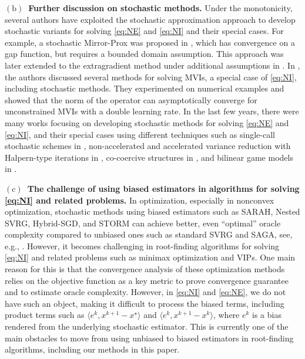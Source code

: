 \documentclass{article}
\newcommand{\iprods}[1]{\langle #1\rangle}
\theoremstyle{plain}
\theoremstyle{definition}
\theoremstyle{remark}
\begin{document}
\noindent\textbf{$\mathrm{(b)}$~Further discussion on stochastic methods.}
Under the monotonicity, several authors have exploited  the stochastic approximation approach \citep{RM1951} to develop stochastic variants for solving \eqref{eq:NE} and \eqref{eq:NI} and their special cases.
For example, a stochastic Mirror-Prox was proposed in \citep{juditsky2011solving}, which has convergence on a gap function, but requires a bounded domain assumption.
This approach was later extended to the extragradient method under additional assumptions in \citep{mishchenko2020revisiting}. 
In  \citep{hsieh2019convergence}, the authors discussed several methods for solving MVIs, a special case of \eqref{eq:NI}, including stochastic methods.
They experimented on numerical examples and showed that the norm of the operator can asymptotically converge for unconstrained MVIs  with a double learning rate.
In the last few years, there were many works focusing on developing stochastic methods for solving \eqref{eq:NE} and \eqref{eq:NI}, and their special cases using different techniques such as  single-call stochastic schemes in \citep{hsieh2019convergence}, non-accelerated and accelerated variance reduction with  Halpern-type iterations in \citep{cai2023variance,cai2022stochastic}, co-coercive structures in \citep{beznosikov2023stochastic}, and bilinear game models in \citep{li2022convergence}.

\noindent\textbf{$\mathrm{(c)}$~The challenge of using biased estimators in algorithms for solving \eqref{eq:NI} and related problems.}
In optimization, especially in nonconvex optimization, stochastic methods using biased estimators such as SARAH, Nested SVRG, Hybrid-SGD, and STORM can achieve better, even ``optimal'' oracle complexity compared to unbiased ones such as standard SVRG and SAGA, see, e.g., \citep{Cutkosky2019,driggs2019bias,Pham2019,Tran-Dinh2019a}.  
However, it becomes challenging in root-finding algorithms for solving \eqref{eq:NI} and related problems such as minimax optimization and VIPs.
One main reason for this is that the convergence analysis of these optimization methods relies on the objective function as a key metric to prove convergence guarantee and to estimate oracle complexity. 
However, in \eqref{eq:NI} and \eqref{eq:NE}, we do not have such an object, making it difficult to process the biased terms, including product terms  such as $\iprods{e^k, x^{k+1} - x^{\star}}$ and $\iprods{e^k, x^{k+1} - x^k}$, where $e^k$ is a bias rendered from the underlying stochastic estimator.
This is currently one of the main obstacles to move from using unbiased to biased estimators in root-finding algorithms, including our methods in this paper.
\end{document}
